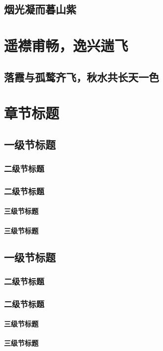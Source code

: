 \documentclass{QHUMaster}
\begin{document}
\section{烟光凝而暮山紫}
\chapter{遥襟甫畅，逸兴遄飞}
\zhlipsum[1-3]
\section{落霞与孤鹜齐飞，秋水共长天一色}
\zhlipsum[1-5]

\chapter{章节标题}
\section{一级节标题}
\subsection{二级节标题}
\subsection{二级节标题}
\subsubsection{三级节标题}
\subsubsection{三级节标题}
\section{一级节标题}
\subsection{二级节标题}
\subsection{二级节标题}
\subsubsection{三级节标题}
\subsubsection{三级节标题}
\end{document}
